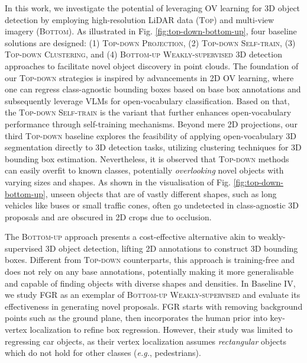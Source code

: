 In this work, we investigate the potential of leveraging OV learning for 3D object detection by employing high-resolution LiDAR data (\textsc{Top}) and multi-view imagery (\textsc{Bottom}). As illustrated in Fig. \ref{fig:top-down-bottom-up}, four baseline solutions are designed: (1) \textsc{Top-down Projection}, (2) \textsc{Top-down Self-train}, (3) \textsc{Top-down Clustering}, and (4) \textsc{Bottom-up Weakly-supervised} 3D detection approaches to facilitate novel object discovery in point clouds. The foundation of our \textsc{Top-down} strategies is inspired by advancements in 2D OV learning, where one can regress class-agnostic bounding boxes based on base box annotations and subsequently leverage VLMs for open-vocabulary classification. Based on that, the \textsc{Top-down Self-train} is the variant that further enhances open-vocabulary performance through self-training mechanisms. Beyond mere 2D projections, our third \textsc{Top-down} baseline explores the feasibility of applying open-vocabulary 3D segmentation directly to 3D detection tasks, utilizing clustering techniques for 3D bounding box estimation. Nevertheless, it is observed that \textsc{Top-down} methods can easily overfit to known classes, potentially \textit{overlooking} novel objects with varying sizes and shapes. As shown in the visualisation of Fig. \ref{fig:top-down-bottom-up}, unseen objects that are of vastly different shapes, such as long vehicles like buses or small traffic cones, often go undetected in class-agnostic 3D proposals and are obscured in 2D crops due to occlusion.

The \textsc{Bottom-up} approach presents a cost-effective alternative akin to weakly-supervised 3D object detection, lifting 2D annotations to construct 3D bounding boxes. Different from \textsc{Top-down} counterparts, this approach is training-free and does not rely on any base annotations, potentially making it more generalisable and capable of finding objects with diverse shapes and densities. In Baseline IV, we study FGR \cite{DBLP:conf/icra/WeiSL021} as an exemplar of \textsc{Bottom-up Weakly-supervised} and evaluate its effectiveness in generating novel proposals. FGR starts with removing background points such as the ground plane, then incorporates the human prior into key-vertex localization to refine box regression. However, their study was limited to regressing car objects, as their vertex localization assumes \textit{rectangular} objects which do not hold for other classes (\textit{e.g.}, pedestrians).

